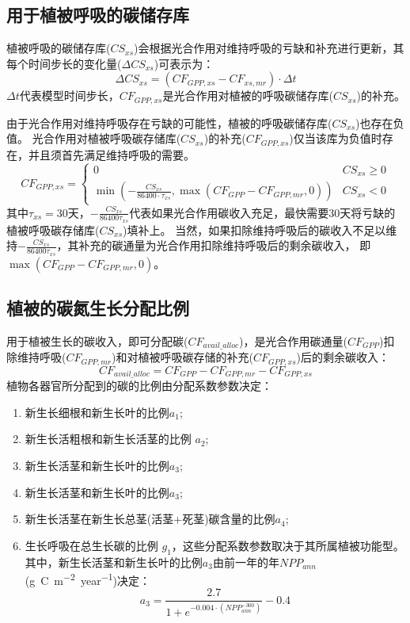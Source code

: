 \subsection{用于植被呼吸的碳储存库}
植被呼吸的碳储存库($CS_{xs}$)会根据光合作用对维持呼吸的亏缺和补充进行更新，其每个时间步长的变化量($\Delta CS_{xs}$)可表示为：
\begin{equation}
\Delta CS_{xs}=\left(CF_{GPP, xs}-CF_{xs, mr}\right) \cdot \Delta t
\end{equation}
$\Delta t$代表模型时间步长，$CF_{GPP,xs}$是光合作用对植被的呼吸碳储存库($CS_{xs}$)的补充。

由于光合作用对维持呼吸存在亏缺的可能性，植被的呼吸碳储存库($CS_{xs}$)也存在负值。
光合作用对植被呼吸碳存储库($CS_{xs}$)的补充($CF_{GPP,xs}$)仅当该库为负值时存在，并且须首先满足维持呼吸的需要。
\begin{equation}
CF_{GPP, xs}=\left\{\begin{array}{ll}0 & CS_{xs} \geq 0 \\ \min \left(-\frac{CS_{xs}}{86400 \cdot \tau_{xs}}, \max \left(CF_{GPP}-CF_{GPP, mr}, 0\right)\right) & CS_{xs}<0\end{array}\right.
\end{equation}
其中$\tau_{xs}=30$天，$-\frac{CS_{xs}}{86400 \tau_{xs}}$代表如果光合作用碳收入充足，最快需要30天将亏缺的植被呼吸碳存储库($CS_{xs}$)填补上。
当然，如果扣除维持呼吸后的碳收入不足以维持$-\frac{CS_{xs}}{86400 \tau_{xs}}$，其补充的碳通量为光合作用扣除维持呼吸后的剩余碳收入，
即$\max{\left(CF_{GPP}-CF_{GPP,mr},0\right)}$。


\subsection{植被的碳氮生长分配比例}
用于植被生长的碳收入，即可分配碳($CF_{avail\_alloc}$)，是光合作用碳通量($CF_{GPP}$)扣除维持呼吸($CF_{GPP,mr}$)和对植被呼吸碳存储的补充($CF_{GPP,xs}$)后的剩余碳收入：
\begin{equation}
CF_{ {avail\_alloc }}=CF_{GPP}-CF_{GPP, mr}-CF_{GPP, xs}
\end{equation}
植物各器官所分配到的碳的比例由分配系数参数决定：
\begin{enumerate}
  \item 新生长细根和新生长叶的比例$a_1$; 
  \item 新生长活粗根和新生长活茎的比例 $a_2$;
  \item 新生长活茎和新生长叶的比例$a_3$;
  \item 新生长活茎和新生长叶的比例$a_3$;
  \item 新生长活茎在新生长总茎(活茎+死茎)碳含量的比例$a_4$;
  \item 生长呼吸在总生长碳的比例 $g_1$，这些分配系数参数取决于其所属植被功能型。其中，新生长活茎和新生长叶的比例$a_3$由前一年的年$NPP_{ann}$ (\unit{g.C.m^{-2}.year^{-1}})决定：
    \begin{equation}
      a_{3}=\frac{2.7}{1+e^{-0.004 \cdot\left(NPP_{ann}^{-300}\right)}}-0.4
    \end{equation}
\end{enumerate}

